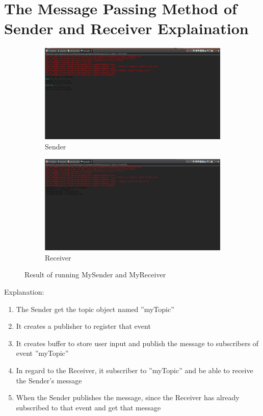 \documentclass[11pt,a4paper]{report}
\begin{document}
	\section{The Message Passing Method of Sender and Receiver Explaination}
	\label{sec:mespassexpl}
	\begin{figure}[h!]
		\centering
  		\begin{subfigure}[b]{0.4\linewidth}
  		\includegraphics[width=\linewidth]{sender-res.png}
    		\caption{Sender}
  		\end{subfigure}
  		\begin{subfigure}[b]{0.4\linewidth}
    		\includegraphics[width=\linewidth]{receiver-res.png}
    		\caption{Receiver}
  		\end{subfigure}
  		\caption{Result of running MySender and MyReceiver}
  		\label{fig:jndi}
	\end{figure}
	Explanation:
	\begin{enumerate}
		\item The Sender get the topic object named ''myTopic''
		\item It creates a publisher to register that event
		\item It creates buffer to store user input and publish the message to subscribers of event ''myTopic''
		\item In regard to the Receiver, it subscriber to ''myTopic'' and be able to receive the Sender’s message
		\item When the Sender publishes the message, since the Receiver has already subscribed to that event and get that message
	\end{enumerate}
\end{document}

